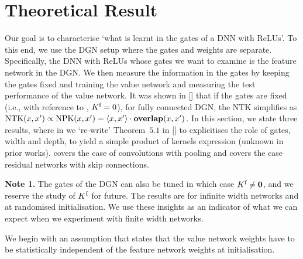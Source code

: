 \section{Theoretical Result}\label{sec:fc}
Our goal is to characterise `what is learnt in the gates of a DNN with ReLUs'. To this end, we use the DGN setup where the gates and weights are separate. Specifically, the DNN with ReLUs whose gates we want to examine is the feature network in the DGN. We then measure the information in the gates by keeping the gates fixed and training the value network and measuring the test performance of the value network. It was shown in [] that if the gates are fixed  (i.e., with reference to , $K^{\text{f}}=0$), for fully connected DGN, the NTK simplifies as $\text{NTK}(x,x')\propto \text{NPK}(x,x') = \langle x,x'\rangle\cdot {\bf{overlap}}(x,x')$. In this section, we state three results, where in  we `re-write' Theorem~$5.1$ in [] to explicitises the role of gates, width and depth, to yield a simple product of kernels expression (unknown in prior works).   covers the case of convolutions with pooling and  covers the case residual networks with skip connections.

\textbf{Note 1.} The gates of the DGN can also be tuned in which case $K^{\text{f}}\neq \mathbf{0}$, and we reserve the study of $K^{\text{f}}$ for future. The results are for infinite width networks and at randomised initialisation. We use these insights as an indicator of what we can expect when we experiment with finite width networks. 

We begin with an assumption that states that the value network weights have to be statistically independent of the feature network weights at initialisation. %



